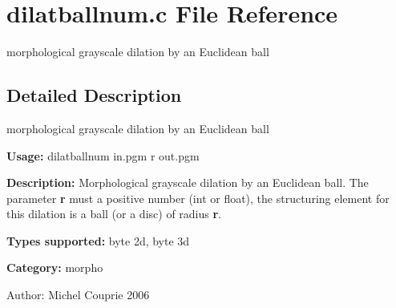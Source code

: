 \section{dilatballnum.c File Reference}
\label{dilatballnum_8c}
morphological grayscale dilation by an Euclidean ball  




\label{_details}
\subsection{Detailed Description}
morphological grayscale dilation by an Euclidean ball 

{\bf Usage:} dilatballnum in.pgm r out.pgm

{\bf Description:} Morphological grayscale dilation by an Euclidean ball. The parameter {\bf r} must a positive number (int or float), the structuring element for this dilation is a ball (or a disc) of radius {\bf r}.

{\bf Types supported:} byte 2d, byte 3d

{\bf Category:} morpho

\begin{Desc}
\item[Author:]Michel Couprie 2006 \end{Desc}
